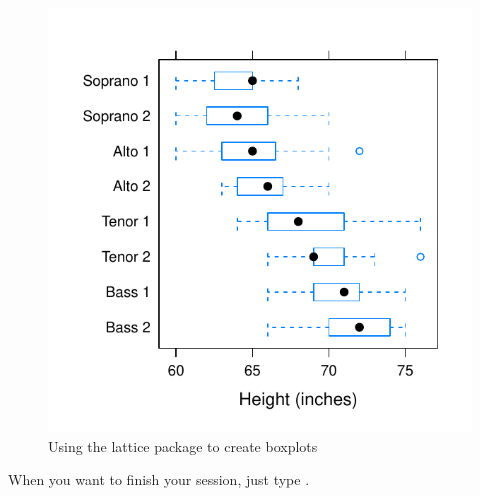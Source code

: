 \begin{knitrout}
\color{fgcolor}\begin{kframe}
\begin{alltt}
\hlstd{(}\hlstd{)}
 \hlopt{~}   \hlstd{=}\hlstd{)}
\end{alltt}
\end{kframe}\begin{figure}

{\centering \includegraphics[width=\maxwidth]{figure/intro-pkg-1} 

}

\caption[Using the lattice package to create boxplots]{Using the lattice package to create boxplots}\label{fig:intro-pkg}
\end{figure}

\end{knitrout}


When you want to finish your session, just type .

